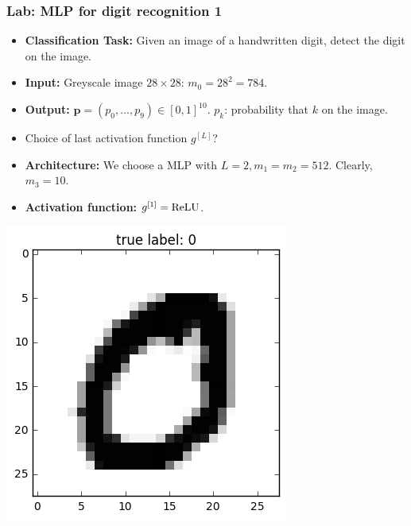 \documentclass[10pt,hyperref={pdfpagelabels=false}]{beamer}
\begin{document}
\begin{frame}
    \frametitle{Lab: MLP for digit recognition 1}
    \begin{minipage}{.7\textwidth}
        {\small
        \begin{itemize}
            \item {\bf Classification Task:} Given an image of a handwritten digit, detect the digit on the image.
            \item {\bf Input:} Greyscale image $28\times 28$: $m_0=28^2=784$.
            \item {\bf Output:} $\mathbf{p}=(p_0, \dots, p_9)\in [0,1]^{10}$. $p_k$: probability that $k$ on the image.
            \item Choice of last activation function $g^{[L]}$?
            \item {\bf Architecture:} We choose a MLP with $L=2, m_1=m_2=512$. Clearly, $m_3=10$.
            \item {\bf Activation function:} $g^{[1]}=\operatorname{ReLU}$.
        \end{itemize}
        }
    \end{minipage}
    \begin{minipage}{.25\textwidth}
        \includegraphics[width=\textwidth]{figures/mnist_data.png}
    \end{minipage}
\end{frame}
\end{document}

